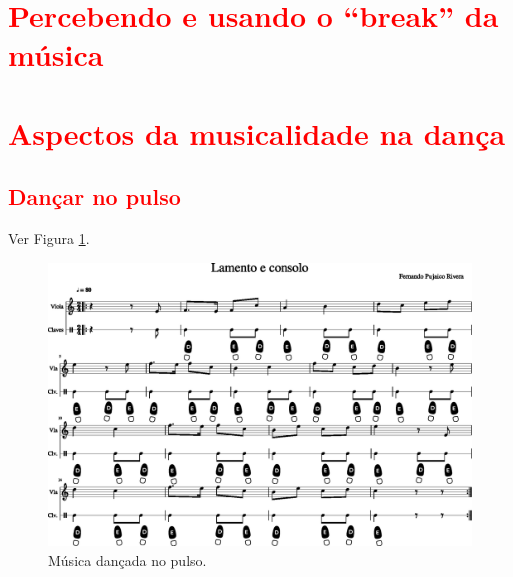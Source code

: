 \section{\textcolor{red}{Percebendo e usando o ``break'' da música}}


\section{\textcolor{red}{Aspectos da musicalidade na dança}}
\subsection{\textcolor{red}{Dançar no pulso}}
Ver Figura \ref{fig:lamentoconsolopulso1}.
\begin{figure}
    \centering
    \includegraphics[width=\textwidth]{chapters/cap-musica-musicalidade/lamento-e-consolo-clave-pulso-1.eps}
    \caption{Música dançada no pulso.}
    \label{fig:lamentoconsolopulso1}
\end{figure}

